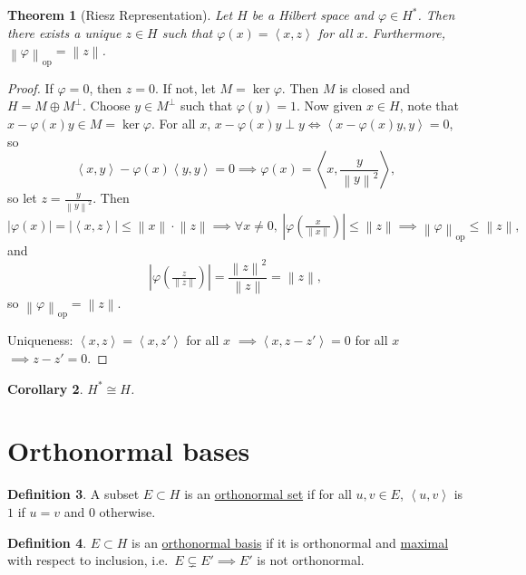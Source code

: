 \documentclass[12pt]{article}
\newcommand{\abs}[1]{\left| #1 \right|}
\newcommand{\norm}[1]{\left\| #1 \right\|}
\newcommand{\ip}[2]{\left\langle #1, #2 \right\rangle}
\newtheorem{thm}{Theorem}[section]
\newtheorem{cor}[thm]{Corollary}
\theoremstyle{definition}
\newtheorem{defn}[thm]{Definition}
\begin{document}
\begin{thm}[Riesz Representation]
	Let $H$ be a Hilbert space and $\varphi \in H^*$.
	Then there exists a unique $z \in H$ such that $\varphi(x) = \ip{x}{z}$ for all $x$.
	Furthermore, $\norm{\varphi}_{\mathrm{op}} = \norm{z}$.
\end{thm}
\begin{proof}
	If $\varphi = 0$, then $z = 0$.
	If not, let $M = \ker \varphi$.
	Then $M$ is closed and $H = M \oplus M^\perp$.
	Choose $y \in M^\perp$ such that $\varphi(y) = 1$.
	Now given $x \in H$, note that $x - \varphi(x) y \in M = \ker \varphi$.
	For all $x$, $x - \varphi(x)y \perp y \iff \ip{x - \varphi(x)y}{y} = 0$, so
	\begin{equation*}
		\ip{x}{y} - \varphi(x) \ip{y}{y} = 0 \implies \varphi(x) = \ip{x}{\frac{y}{\norm{y}^2}},
	\end{equation*}
	so let $z = \frac{y}{\norm{y}^2}$.
	Then
	\begin{equation*}
		\abs{\varphi(x)} = \abs{\ip{x}{z}} \leq \norm{x} \cdot \norm{z} \implies \forall x \neq 0, \ \abs{\varphi\left( \tfrac{x}{\norm{x}} \right)} \leq \norm{z} \implies \norm{\varphi}_{\mathrm{op}} \leq \norm{z},
	\end{equation*}
	and
	\begin{equation*}
		\abs{\varphi\left( \tfrac{z}{\norm{z}} \right)} = \frac{\norm{z}^2}{\norm{z}} = \norm{z},
	\end{equation*}
	so $\norm{\varphi}_{\mathrm{op}} = \norm{z}$.

	Uniqueness: $\ip{x}{z} = \ip{x}{z'}$ for all $x$ $\implies \ip{x}{z - z'} = 0$ for all $x$ $\implies z - z' = 0$.
\end{proof}

\begin{cor}
	$H^* \cong H$.
\end{cor}

\section{Orthonormal bases}

\begin{defn}
	A subset $E \subset H$ is an \underline{orthonormal set} if for all $u, v \in E$, $\ip{u}{v}$ is $1$ if $u = v$ and $0$ otherwise.
\end{defn}

\begin{defn}
	$E \subset H$ is an \underline{orthonormal basis} if it is orthonormal and \underline{maximal} with respect to inclusion, i.e.\ $E \subsetneq E' \implies E'$ is not orthonormal.
\end{defn}
\end{document}
